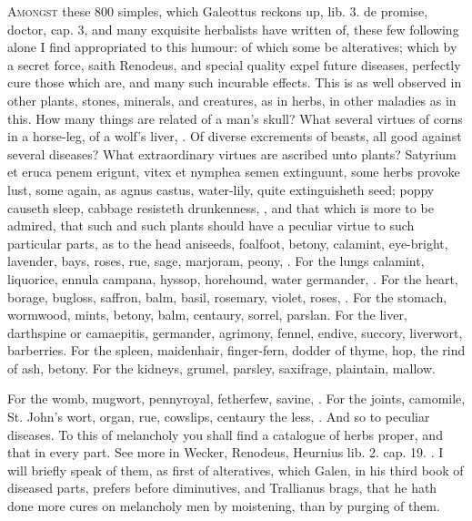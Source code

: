 {\lettrine{A}{mongst} these 800 simples, which Galeottus reckons up, lib. 3. de
promise, doctor, cap. 3, and many exquisite herbalists have written of,
these few following alone I find appropriated to this humour: of which
some be alteratives; which by a secret force, saith Renodeus, and
special quality expel future diseases, perfectly cure those which are,
and many such incurable effects. This is as well observed in other
plants, stones, minerals, and creatures, as in herbs, in other maladies
as in this. How many things are related of a man's skull? What several
virtues of corns in a horse-leg, of a wolf's liver, \etc{}. Of
diverse excrements of beasts, all good against several diseases?
What extraordinary virtues are ascribed unto plants? Satyrium et
eruca penem erigunt, vitex et nymphea semen extinguunt, some
herbs provoke lust, some again, as agnus castus, water-lily, quite
extinguisheth seed; poppy causeth sleep, cabbage resisteth drunkenness,
\etc{}, and that which is more to be admired, that such and such plants
should have a peculiar virtue to such particular parts, as to the
head aniseeds, foalfoot, betony, calamint, eye-bright, lavender, bays,
roses, rue, sage, marjoram, peony, \etc{}. For the lungs calamint,
liquorice, ennula campana, hyssop, horehound, water germander, \etc{}. For
the heart, borage, bugloss, saffron, balm, basil, rosemary, violet,
roses, \etc{}. For the stomach, wormwood, mints, betony, balm, centaury,
sorrel, parslan. For the liver, darthspine or camaepitis, germander,
agrimony, fennel, endive, succory, liverwort, barberries. For the
spleen, maidenhair, finger-fern, dodder of thyme, hop, the rind of ash,
betony. For the kidneys, grumel, parsley, saxifrage, plaintain, mallow.

For the womb, mugwort, pennyroyal, fetherfew, savine, \etc{}. For the
joints, camomile, St. John's wort, organ, rue, cowslips, centaury the
less, \etc{}. And so to peculiar diseases. To this of melancholy you shall
find a catalogue of herbs proper, and that in every part. See more in
Wecker, Renodeus, Heurnius lib. 2. cap. 19. \etc{}. I will briefly speak of
them, as first of alteratives, which Galen, in his third book of
diseased parts, prefers before diminutives, and Trallianus brags, that
he hath done more cures on melancholy men by moistening, than by
purging of them.

}
